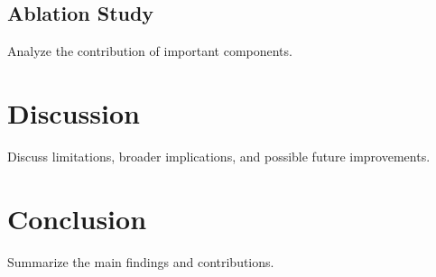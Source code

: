 \documentclass[lettersize,journal]{IEEEtran}
\begin{document}
\subsection{Ablation Study}
\label{sec:ablation_study}
Analyze the contribution of important components.

\section{Discussion}
\label{sec:discussion}
Discuss limitations, broader implications, and possible future improvements.

\section{Conclusion}
\label{sec:conclusion}
Summarize the main findings and contributions.



\end{document}
